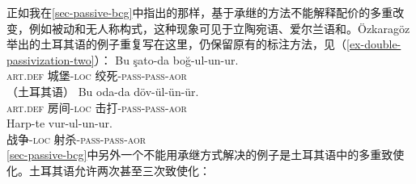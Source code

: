 \begin{exe}
\begin{xlist}[iv.]
\begin{exe}
\begin{xlist}[iv.]
正如我在\ref{sec-passive-bcg}中指出的那样，基于承继的方法不能解释配价的多重改变，例如被动和无人称构式，这种现象可见于立陶宛语\citep[\S~5]{Timberlake82a}、爱尔兰语\citep{Noonan94a}和\citep{Ozkaragoez86a}。Özkaragöz举出的土耳其语的例子重复写在这里，仍保留原有的标注方法，见（\ref{ex-double-passivization-two}）：
\eal\label{ex-double-passivization-two}
\ex\label{ex-double-passivization-strangle-two}
\gll Bu şato-da boğ-ul-un-ur.\\
     \textsc{art}.\textsc{def} 城堡-\textsc{loc} 绞死-\textsc{pass}-\textsc{pass}-\textsc{aor}\\\hfill（土耳其语）
\ex\label{ex-double-passivization-hit-two}
\gll Bu oda-da döv-ül-ün-ür.\\
     \textsc{art}.\textsc{def} 房间-\textsc{loc} 击打-\textsc{pass}-\textsc{pass}-\textsc{aor}\\
\ex
\gll Harp-te vur-ul-un-ur.\\
     战争-\textsc{loc} 射杀-\textsc{pass}-\textsc{pass}-\textsc{aor}\\
\zl
\ref{sec-passive-bcg}中另外一个不能用承继方式解决的例子是土耳其语中的多重致使化。土耳其语允许两次甚至三次致使化\citep[]{Lewis67a-u}：

\end{xlist}
\end{exe}
\end{xlist}
\end{exe}
